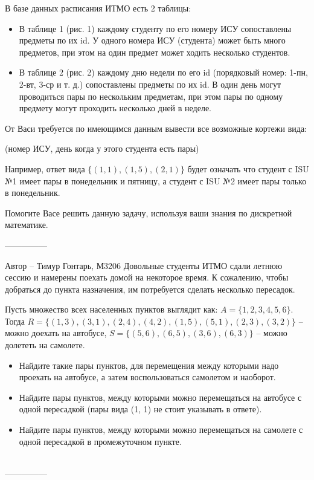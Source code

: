 \documentclass[10pt]{exam}
\begin{document}
\begin{questions}
В базе данных расписания ИТМО есть 2 таблицы:
\begin{itemize}
    \item В таблице 1 (рис. 1) каждому студенту по его номеру ИСУ сопоставлены предметы по их id. У одного номера ИСУ (студента) может быть много предметов, при этом на один предмет может ходить несколько студентов.
    \item В таблице 2 (рис. 2) каждому дню недели по его id (порядковый номер: 1-пн, 2-вт, 3-ср и т. д.) сопоставлены предметы по их id. В один день могут проводиться пары по нескольким предметам, при этом пары по одному предмету могут проходить несколько дней в неделе.
\end{itemize}
От Васи требуется по имеющимся данным вывести все возможные кортежи вида:

\begin{center}(номер ИСУ, день когда у этого студента есть пары)\end{center}

Например, ответ вида $\{(1, 1), (1, 5), (2, 1)\}$ будет означать что студент с ISU №1 имеет пары в понедельник и пятницу, а студент с ISU №2 имеет пары только в понедельник.

Помогите Васе решить данную задачу, используя ваши знания по дискретной математике.

---------------

Автор -- Тимур Гонтарь, М3206\question
Довольные студенты ИТМО сдали летнюю сессию и намерены поехать домой на некоторое время. К сожалению, чтобы добраться до пункта назначения, им потребуется сделать несколько пересадок.

Пусть множество всех населенных пунктов выглядит как: $A = \{1, 2, 3, 4, 5, 6\}$.
\\
Тогда $R = \{(1, 3), (3, 1), (2, 4), (4, 2), (1, 5), (5, 1), (2, 3), (3, 2)\}$ -- можно доехать на автобусе, $S = \{(5, 6), (6, 5), (3, 6), (6, 3)\}$ -- можно долететь на самолете.

\begin{itemize}
    \item Найдите такие пары пунктов, для перемещения между которыми надо проехать на автобусе, а затем воспользоваться самолетом и наоборот.
    \item Найдите пары пунктов, между которыми можно перемещаться на автобусе с одной пересадкой (пары вида (1, 1) не стоит указывать в ответе).
    \item Найдите пары пунктов, между которыми можно перемещаться на самолете с одной пересадкой в промежуточном пункте.
\end{itemize}
\\
---------------


\end{questions}
\end{document}
